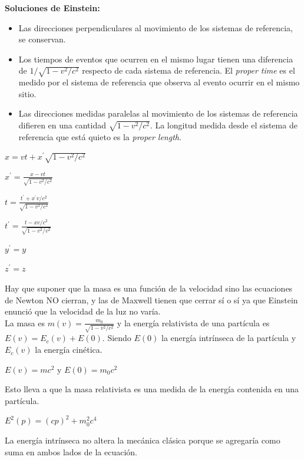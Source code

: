 \documentclass[oneside]{book}
\numberwithin{equation}{section}
\numberwithin{figure}{section}
\numberwithin{table}{section}
\begin{document}
		\textbf{Soluciones de Einstein:}
		\begin{itemize}
			\item Las direcciones perpendiculares al movimiento de los sistemas de referencia, se conservan.
			\item Los tiempos de eventos que ocurren en el mismo lugar tienen una diferencia de $1/\sqrt{1-v^{2}/c^{2}}$ respecto de cada sistema de referencia. El \emph{proper time} es el medido por el sistema de referencia que observa al evento ocurrir en el mismo sitio.
			\item Las direcciones medidas paralelas al movimiento de los sistemas de referencia difieren en una cantidad $\sqrt{1-v^{2}/c^{2}}$. La longitud medida desde el sistema de referencia que está quieto es la \emph{proper length}.
\end{itemize}

\begin{center}
$x=vt+x^\prime \sqrt{1-v^{2}/c^{2}}$

$x^\prime=\frac{x-vt}{\sqrt{1-v^{2}/c^{2}}}$

$t=\frac{t^\prime+x^\prime v/c^{2}}{\sqrt{1-v^{2}/c^{2}}}$

$t^\prime=\frac{t-xv/c^{2}}{\sqrt{1-v^{2}/v^{2}}}$

$y^\prime=y$ 

$z^\prime=z$
\end{center}

Hay que suponer que la masa es una función de la velocidad sino las ecuaciones de Newton NO cierran, y las de Maxwell tienen que cerrar sí o sí ya que Einstein enunció que la velocidad de la luz no varía.\\

La masa es $m(v)=\frac{m_{0}}{\sqrt{1-v^{2}/c^{2}}}$ y la energía relativista de una partícula es $E(v)=E_{c}(v)+E(0)$. Siendo $E(0)$ la energía intrínseca de la partícula y $E_{c}(v)$ la energía cinética.\\

\begin{center}
	$E(v)=mc^2 \textrm{   y   } E(0)=m_0 c^2$
\end{center}

Esto lleva a que la masa relativista es una medida de la energía contenida en una partícula.

\begin{center}
	$E^2(p)=(c p)^2+m_0^2 c^4$
\end{center}

La energía intrínseca no altera la mecánica clásica porque se agregaría como suma en ambos lados de la ecuación.			
		
\end{document}
